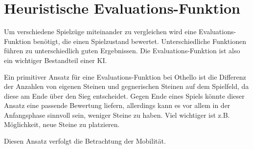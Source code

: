 \section{Heuristische Evaluations-Funktion}

Um verschiedene Spielzüge miteinander zu vergleichen wird eine Evaluations-Funktion benötigt, die einen Spielzustand bewertet.
Unterschiedliche Funktionen führen zu unterschiedlich guten Ergebnissen.
Die Evaluations-Funktion ist also ein wichtiger Bestandteil einer KI.

Ein primitiver Ansatz für eine Evaluations-Funktion bei Othello ist die Differenz der Anzahlen von eigenen Steinen und gegnerischen Steinen auf dem Spielfeld, da diese am Ende über den Sieg entscheidet.
Gegen Ende eines Spiels könnte dieser Ansatz eine passende Bewertung liefern, allerdings kann es vor allem in der Anfangsphase sinnvoll sein, weniger Steine zu haben.
Viel wichtiger ist z.B. Möglichkeit, neue Steine zu platzieren.

Diesen Ansatz verfolgt die Betrachtung der Mobilität.

\cite{evaluationfunctions}
